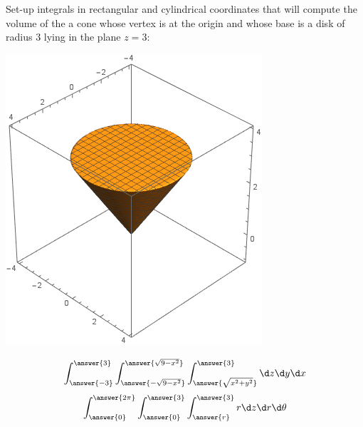 \documentclass{ximera}
\author{Bart Snapp}
\begin{document}
\begin{exercise}
  Set-up integrals in rectangular and cylindrical coordinates that
  will compute the volume of the a cone whose vertex is at the origin
  and whose base is a disk of radius $3$ lying in the plane $z=3$:
  \begin{image}
    \includegraphics{cone1.png}
  \end{image}
  \begin{prompt}
  \[
  \int_{\answer{-3}}^{\answer{3}}\int_{\answer{-\sqrt{9-x^2}}}^{\answer{\sqrt{9-x^2}}}\int_{\answer{\sqrt{x^2+y^2}}}^{\answer{3}}\d z \d y \d x
  \]
  \[
  \int_{\answer{0}}^{\answer{2\pi}}\int_{\answer{0}}^{\answer{3}}\int_{\answer{r}}^{\answer{3}}   r\d z \d r \d \theta
  \]
  \end{prompt}
\end{exercise}
\end{document}
